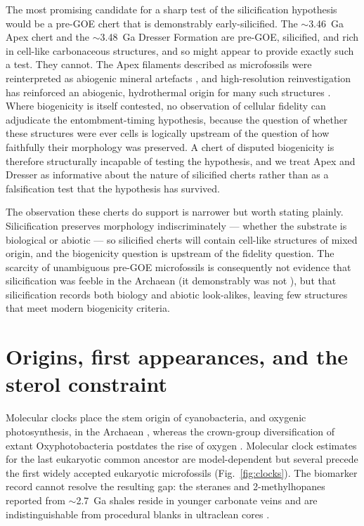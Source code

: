 \documentclass[11pt]{article}
\begin{document}
The most promising candidate for a sharp test of the silicification hypothesis would be a pre-GOE
chert that is demonstrably early-silicified. The $\sim$3.46~Ga Apex chert and the $\sim$3.48~Ga
Dresser Formation are pre-GOE, silicified, and rich in cell-like carbonaceous structures, and so
might appear to provide exactly such a test. They cannot. The Apex filaments described as
microfossils \citep{Schopf1993} were reinterpreted as abiogenic mineral artefacts
\citep{Brasier2002}, and high-resolution reinvestigation has reinforced an abiogenic, hydrothermal
origin for many such structures \citep{Wacey2014}. Where biogenicity is itself contested, no
observation of cellular fidelity can adjudicate the entombment-timing hypothesis, because the
question of whether these structures were ever cells is logically upstream of the question of how
faithfully their morphology was preserved. A chert of disputed biogenicity is therefore structurally
incapable of testing the hypothesis, and we treat Apex and Dresser as informative about the nature
of silicified cherts rather than as a falsification test that the hypothesis has survived.

The observation these cherts do support is narrower but worth stating plainly. Silicification
preserves morphology indiscriminately --- whether the substrate is biological or abiotic --- so
silicified cherts will contain cell-like structures of mixed origin, and the biogenicity question is
upstream of the fidelity question. The scarcity of unambiguous pre-GOE microfossils is consequently
not evidence that silicification was feeble in the Archaean (it demonstrably was not
\citep{Siever1992,Perry2007}), but that silicification records both biology and abiotic look-alikes,
leaving few structures that meet modern biogenicity criteria.

\section{Origins, first appearances, and the sterol constraint}

Molecular clocks place the stem origin of cyanobacteria, and oxygenic photosynthesis, in the Archaean
\citep{Fournier2021}, whereas the crown-group diversification of extant Oxyphotobacteria postdates
the rise of oxygen \citep{Shih2017}. Molecular clock estimates for the last eukaryotic common
ancestor are model-dependent but several precede the first widely accepted eukaryotic microfossils
\citep{Betts2018,Eme2014} (Fig.~\ref{fig:clocks}). The biomarker record cannot resolve the resulting
gap: the steranes and 2-methylhopanes reported from $\sim$2.7~Ga shales \citep{Brocks1999} reside in
younger carbonate veins \citep{Rasmussen2008} and are indistinguishable from procedural blanks in
ultraclean cores \citep{French2015}.
\end{document}
